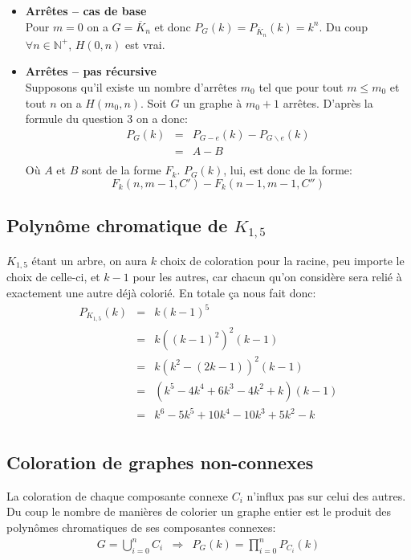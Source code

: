 \begin{itemize}
\item \textbf{Arrêtes -- cas de base} \\
Pour $m = 0$ on a $G = \overline{K}_n$ et donc $P_G(k) = P_{\overline{K}_n}(k) = k^n$. Du coup $\forall n \in \mathbb{N^+}$, $H(0,n)$ est vrai.
\item \textbf{Arrêtes -- pas récursive} \\
Supposons qu'il existe un nombre d'arrêtes $m_0$ tel que pour tout $m \leq m_0$ et tout $n$ on a $H(m_0,n)$. Soit $G$ un graphe à $m_0 + 1$ arrêtes. D'après la formule du question $3$ on a donc:
\begin{eqnarray*}
P_G(k) &=& P_{G-e}(k) - P_{G \backslash e}(k)	\\
		&=& A - B								\\	
\end{eqnarray*}
Où $A$ et $B$ sont de la forme $F_k$. $P_G(k)$, lui, est donc de la forme:
\[ F_k(n,m-1,C') - F_k(n-1,m-1,C'') \]

\end {itemize}

\subsection{Polynôme chromatique de $K_{1,5}$}
$K_{1,5}$ étant un arbre, on aura $k$ choix de coloration pour la racine, peu importe le choix de celle-ci, et $k-1$ pour les autres, car chacun qu'on considère sera relié à exactement une autre déjà colorié. En totale ça nous fait donc:
\begin{eqnarray*}
P_{K_{1,5}}(k) 	& = & k(k-1)^5 \\
				& = & k{((k-1)^2)}^2(k-1)	\\
				& = & k(k^2 - (2k - 1))^2(k-1)	\\
				& = & (k^5 - 4k^4  + 6k^3 - 4k^2 + k)(k-1)  \\
				& = & k^6 - 5k^5  + 10k^4 - 10k^3 + 5k^2 - k	\\ 
\end{eqnarray*}

\subsection{Coloration de graphes non-connexes}
La coloration de chaque composante connexe $C_i$ n'influx pas sur celui des autres. Du coup le nombre de manières de colorier un graphe entier est le produit des polynômes chromatiques de ses composantes connexes:
\begin{eqnarray*}
G = \bigcup_{i=0}^n C_i & \Rightarrow & P_G(k)=\prod_{i=0}^n P_{C_i}(k) \\
\end{eqnarray*}

